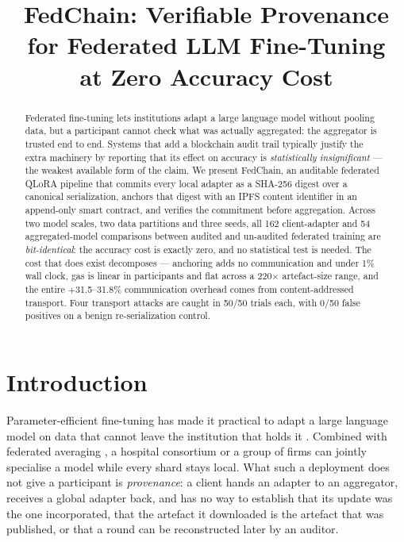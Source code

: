\documentclass[11pt]{article}
\title{FedChain: Verifiable Provenance for Federated LLM Fine-Tuning\\at Zero Accuracy Cost}
\begin{document}
\maketitle

\begin{abstract}
Federated fine-tuning lets institutions adapt a large language model without pooling data, but a participant cannot check what was actually aggregated: the aggregator is trusted end to end. Systems that add a blockchain audit trail typically justify the extra machinery by reporting that its effect on accuracy is \emph{statistically insignificant} --- the weakest available form of the claim. We present FedChain, an auditable federated QLoRA pipeline that commits every local adapter as a SHA-256 digest over a canonical serialization, anchors that digest with an IPFS content identifier in an append-only smart contract, and verifies the commitment before aggregation. Across two model scales, two data partitions and three seeds, all 162 client-adapter and 54 aggregated-model comparisons between audited and un-audited federated training are \emph{bit-identical}: the accuracy cost is exactly zero, and no statistical test is needed. The cost that does exist decomposes --- anchoring adds no communication and under 1\% wall clock, gas is linear in participants and flat across a 220$\times$ artefact-size range, and the entire $+$31.5--31.8\% communication overhead comes from content-addressed transport. Four transport attacks are caught in 50/50 trials each, with 0/50 false positives on a benign re-serialization control.
\end{abstract}

\section{Introduction}

Parameter-efficient fine-tuning has made it practical to adapt a large language model on data that cannot leave the institution that holds it \cite{hu2022lora,dettmers2023qlora}. Combined with federated averaging \cite{mcmahan2017communication}, a hospital consortium or a group of firms can jointly specialise a model while every shard stays local. What such a deployment does not give a participant is \emph{provenance}: a client hands an adapter to an aggregator, receives a global adapter back, and has no way to establish that its update was the one incorporated, that the artefact it downloaded is the artefact that was published, or that a round can be reconstructed later by an auditor.
\end{document}
